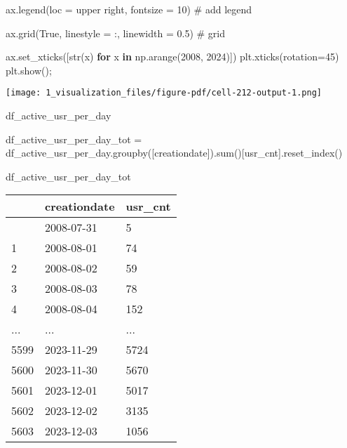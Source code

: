 \documentclass[
  letterpaper,
  DIV=11,
  numbers=noendperiod]{scrartcl}
\newenvironment{Shaded}{\begin{snugshade}}{\end{snugshade}}
\newcommand{\BuiltInTok}[1]{\textcolor[rgb]{0.00,0.23,0.31}{#1}}
\newcommand{\CommentTok}[1]{\textcolor[rgb]{0.37,0.37,0.37}{#1}}
\newcommand{\ControlFlowTok}[1]{\textcolor[rgb]{0.00,0.23,0.31}{\textbf{#1}}}
\newcommand{\DecValTok}[1]{\textcolor[rgb]{0.68,0.00,0.00}{#1}}
\newcommand{\FloatTok}[1]{\textcolor[rgb]{0.68,0.00,0.00}{#1}}
\newcommand{\KeywordTok}[1]{\textcolor[rgb]{0.00,0.23,0.31}{\textbf{#1}}}
\newcommand{\NormalTok}[1]{\textcolor[rgb]{0.00,0.23,0.31}{#1}}
\newcommand{\OperatorTok}[1]{\textcolor[rgb]{0.37,0.37,0.37}{#1}}
\newcommand{\StringTok}[1]{\textcolor[rgb]{0.13,0.47,0.30}{#1}}
\newcommand{\VariableTok}[1]{\textcolor[rgb]{0.07,0.07,0.07}{#1}}
\begin{document}
\begin{Shaded}
\begin{Highlighting}[]
\NormalTok{ax.legend(loc }\OperatorTok{=} \StringTok{\textquotesingle{}upper right\textquotesingle{}}\NormalTok{, fontsize }\OperatorTok{=} \DecValTok{10}\NormalTok{) }\CommentTok{\# add legend}

\NormalTok{ax.grid(}\VariableTok{True}\NormalTok{, linestyle }\OperatorTok{=} \StringTok{\textquotesingle{}:\textquotesingle{}}\NormalTok{, linewidth }\OperatorTok{=} \FloatTok{0.5}\NormalTok{) }\CommentTok{\# grid}

\NormalTok{ax.set\_xticks([}\BuiltInTok{str}\NormalTok{(x) }\ControlFlowTok{for}\NormalTok{ x }\KeywordTok{in}\NormalTok{ np.arange(}\DecValTok{2008}\NormalTok{, }\DecValTok{2024}\NormalTok{)])}
\NormalTok{plt.xticks(rotation}\OperatorTok{=}\DecValTok{45}\NormalTok{)}
\NormalTok{plt.show()}\OperatorTok{;}
\end{Highlighting}
\end{Shaded}

\texttt{[image: 1\_visualization\_files/figure-pdf/cell-212-output-1.png]}

\begin{Shaded}
\begin{Highlighting}[]
\NormalTok{df\_active\_usr\_per\_day}


\NormalTok{df\_active\_usr\_per\_day\_tot }\OperatorTok{=}\NormalTok{ df\_active\_usr\_per\_day.groupby([}\StringTok{\textquotesingle{}creationdate\textquotesingle{}}\NormalTok{]).}\BuiltInTok{sum}\NormalTok{()[}\StringTok{\textquotesingle{}usr\_cnt\textquotesingle{}}\NormalTok{].reset\_index()}
\end{Highlighting}
\end{Shaded}

\begin{Shaded}
\begin{Highlighting}[]
\NormalTok{df\_active\_usr\_per\_day\_tot}
\end{Highlighting}
\end{Shaded}

\begin{longtable}[]{@{}lll@{}}
\toprule\noalign{}
& creationdate & usr\_cnt \\
\midrule\noalign{}
\endhead
\bottomrule\noalign{}
\endlastfoot
0 & 2008-07-31 & 5 \\
1 & 2008-08-01 & 74 \\
2 & 2008-08-02 & 59 \\
3 & 2008-08-03 & 78 \\
4 & 2008-08-04 & 152 \\
... & ... & ... \\
5599 & 2023-11-29 & 5724 \\
5600 & 2023-11-30 & 5670 \\
5601 & 2023-12-01 & 5017 \\
5602 & 2023-12-02 & 3135 \\
5603 & 2023-12-03 & 1056 \\
\end{longtable}
\end{document}
